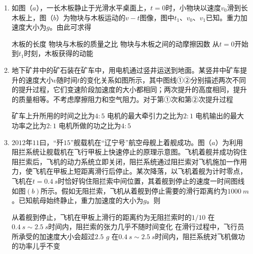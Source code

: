 \begin{enumerate}[leftmargin=0em]
\item 
{}
如图（$ a $），一长木板静止于光滑水平桌面上，$ t=0 $时，小物块以速度$ v_{0} $滑到长木板上，图（$ b $）为物块与木板运动的$ v-t $图像，图中$ t_{1} $、$ v_{0} $、$ v_{1} $已知。重力加速度大小为$ g $。由此可求得  
\begin{figure}[h!]
\centering
 \qquad 
  
\end{figure}

\fourchoices
{木板的长度}
{物块与木板的质量之比}
{物块与木板之间的动摩擦因数}
{从$ t=0 $开始到$ t_{1} $时刻，木板获得的动能}

\item 
{}
地下矿井中的矿石装在矿车中，用电机通过竖井运送到地面。某竖井中矿车提升的速度大小$ v $随时间$ t $的变化关系如图所示，其中图线①②分别描述两次不同的提升过程，它们变速阶段加速度的大小都相同；两次提升的高度相同，提升的质量相等。不考虑摩擦阻力和空气阻力。对于第①次和第②次提升过程  
\begin{figure}[h!]
\centering

\end{figure}

\fourchoices
{矿车上升所用的时间之比为$ 4:5 $}
{电机的最大牵引力之比为$ 2:1 $}
{电机输出的最大功率之比为$ 2:1 $}
{电机所做的功之比为$ 4:5 $}

\item 
{}
$ 2012 $年$ 11 $曰，“歼$ 15 $”舰载机在“辽宁号”航空母舰上着舰成功。图（$ a $）为利用阻拦系统让舰载机在飞行甲板上快速停止的原理示意图。飞机着舰并成功钩住阻拦索后，飞机的动力系统立即关闭，阻拦系统通过阻拦索对飞机施加一作用力，使飞机在甲板上短距离滑行后停止。某次降落，以飞机着舰为计时零点，飞机在$ t=0.4\ s $时恰好钩住阻拦索中间位置，其着舰到停止的速度一时间图线如图$ (b) $所示。假如无阻拦索，飞机从着舰到停止需要的滑行距离约为$ 1000\ m $。已知航母始终静止，重力加速度的大小为$ g $。则  
\begin{figure}[h!]
\centering

\end{figure}

\fourchoices
{从着舰到停止，飞机在甲板上滑行的距离约为无阻拦索时的$ 1/10 $}
{在$ 0.4\ s \sim 2.5\ s $时间内，阻拦索的张力几乎不随时间变化}
{在滑行过程中，飞行员所承受的加速度大小会超过$ 2.5 $ $ g $}
{在$ 0.4\ s \sim 2.5\ s $时间内，阻拦系统对飞机做功的功率儿乎不变}




\end{enumerate}
